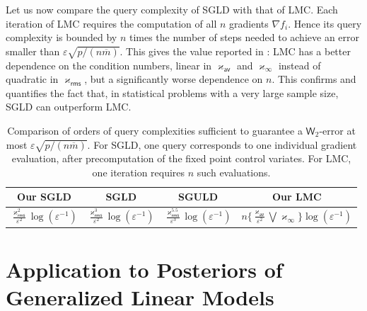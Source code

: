 \documentclass[aos,reqno]{imsart}
\def\wass{\mathsf{W}}
\def\kappav{\varkappa_{\textsf{av}}}
\def\kappamax{\varkappa_{\infty}}
\def\kapparms{\varkappa_{\textsf{rms}}}
\def\mbar{\overline m}
\theoremstyle{definition}
\begin{document}
Let us now compare the query complexity of SGLD with that
of LMC. Each iteration of LMC requires the computation of
all $n$ gradients $\nabla f_i$. Hence its query complexity
is bounded by $n$ times the number of steps needed to
achieve an error smaller than
$\varepsilon\sqrt{p/(n\mbar)}$. This gives the value reported
in : LMC has a better
dependence on the condition numbers, linear in $\kappav$
and $\kappamax$ instead of quadratic in $\kapparms$, but a
significantly worse dependence on $n$. This confirms and
quantifies the fact that, in statistical problems with a
very large sample size, SGLD can outperform LMC.

\begin{table}[t]
    \centering
    \begin{tabular}{@{}ccc|c@{}}
    \toprule
    Our SGLD &  SGLD \cite{BrosseDM18} & SGULD 
    \cite{chatterji2018} & Our LMC
    \\
    \midrule
    $\displaystyle
    \frac{\kapparms^2}
    {\varepsilon^2}\log(\varepsilon^{-1})$
    &
    $\displaystyle
    \frac{\kapparms^3}{\varepsilon^2}
    \log(\varepsilon^{-1})$
    &
    $\displaystyle
    \frac{\kapparms^{5.5}}{\varepsilon^3}\log(
    \varepsilon^{-1})$
    &
    $\displaystyle
    n\Big\{\frac{\kappav}{\varepsilon^2}
    \bigvee \kappamax \Big\}\log(\varepsilon^{-1})$\\
    \bottomrule
    \end{tabular}
    \caption{Comparison of orders of query complexities 
    sufficient to guarantee a $\wass_2$-error at most
    $\varepsilon\sqrt{p/(n\mbar)}$. For SGLD, one query
    corresponds to one individual gradient evaluation,
    after precomputation of the fixed point control
    variates. For LMC, one iteration requires $n$ such
    evaluations.}
    \label{table:sgld-comparison}
\end{table}

\section{Application to Posteriors of Generalized Linear 
Models}\label{Sec:GLM}
\end{document}
